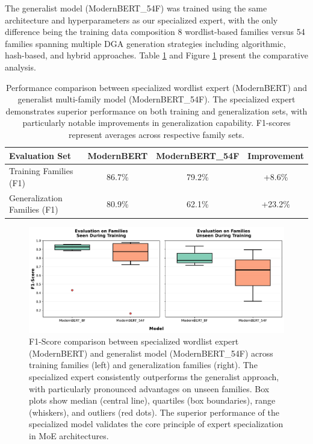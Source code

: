 \documentclass[a4paper]{llncs}
\begin{document}
The generalist model (ModernBERT\_54F) was trained using the same architecture and hyperparameters as our specialized expert, with the only difference being the training data composition 8 wordlist-based families versus 54 families spanning multiple DGA generation strategies including algorithmic, hash-based, and hybrid approaches. Table \ref{tab:specialization_comparison} and Figure \ref{fig:performance_comparison} present the comparative analysis.

\begin{table}[htbp]
\centering
\caption{Performance comparison between specialized wordlist expert (ModernBERT) and generalist multi-family model (ModernBERT\_54F). The specialized expert demonstrates superior performance on both training and generalization sets, with particularly notable improvements in generalization capability. F1-scores represent averages across respective family sets.}
\label{tab:specialization_comparison}
\begin{tabular}{l|c|c|c}
\toprule
\textbf{Evaluation Set} & \textbf{ModernBERT} & \textbf{ModernBERT\_54F} & \textbf{Improvement} \\
\midrule
Training Families (F1) & 86.7\% & 79.2\% & +8.6\% \\
Generalization Families (F1) & 80.9\% & 62.1\% & +23.2\% \\
\bottomrule
\end{tabular}
\end{table}

\begin{figure}[ht]
\centering
\includegraphics[width=1.0\textwidth]{comparison.pdf}
\caption{F1-Score comparison between specialized wordlist expert (ModernBERT) and generalist model (ModernBERT\_54F) across training families (left) and generalization families (right). The specialized expert consistently outperforms the generalist approach, with particularly pronounced advantages on unseen families. Box plots show median (central line), quartiles (box boundaries), range (whiskers), and outliers (red dots). The superior performance of the specialized model validates the core principle of expert specialization in MoE architectures.}
\label{fig:performance_comparison}
\end{figure}
\end{document}
